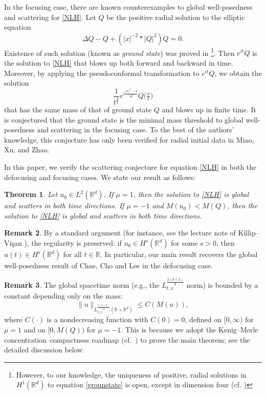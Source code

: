 \documentclass[reqno,11pt]{amsart}
\theoremstyle{plain}
\newtheorem{theorem}{Theorem}
\theoremstyle{definition}
\newtheorem{remark}[theorem]{Remark}
\numberwithin{equation}{section}
\numberwithin{theorem}{section}
\def\leq{\leqslant}
\def\R{\mathbb{R}}
\begin{document}
In the focusing case, there are known counterexamples to global well-posedness and scattering for \eqref{NLH}. Let $Q$ be the positive radial solution to the elliptic equation
\begin{equation}\label{grounstate}
    \Delta Q - Q + \left(|x|^{-2}*|Q|^2\right)Q = 0. 
\end{equation}
Existence of such solution (known as \emph{ground state}) was proved in \cite{MiaoXuZhaoblowup,Moroz}\footnote{However, to our knowledge, the uniqueness of positive, radial solutions in $H^1(\mathbb{R}^d)$ to equation \eqref{grounstate} is open, except in dimension four (cf. \cite{Krieger})}. Then $e^{it}Q$ is the solution to \eqref{NLH} that blows up both forward and backward in time. Moreover, by applying the pseudoconformal transformation to $e^{it}Q$, we obtain the solution
\[
\frac{1}{t^{\frac{d}{2}}}e^{i\frac{|x|^2-4}{4t}}Q\big(\tfrac{x}{t}\big)
\]
that has the same mass of that of ground state $Q$ and blows up in finite time. It is conjectured that the ground state is the minimal mass threshold to global well-posedness and scattering in the focusing case. To the best of the authors' knowledge, this conjecture has only been verified for radial initial data in Miao, Xu, and Zhao\cite{MXZ-JMPA}.

In this paper, we verify the scattering conjecture for equation \eqref{NLH} in both the defocusing and focusing cases. We state our result as follows:
\begin{theorem}\label{main}
Let $u_0\in L^2(\R^d)$. If $\mu=1$, then the solution to \eqref{NLH} is global and scatters in both time directions. If $\mu=-1$ and $M(u_0)<M(Q)$, then the solution to \eqref{NLH}  is global and scatters in both time directions.
\end{theorem}

\begin{remark}
    By a standard argument (for instance, see the lecture note of Killip--Vi\c{s}an \cite{KV}), the regularity is preserved: if $u_0\in H^s(\mathbb{R}^d)$ for some $s>0$, then $u(t)\in H^s(\mathbb{R}^d)$ for all $t\in\R$. In particular, our main result recovers the global well-posedness result of Chae, Cho and Lee \cite{CCS} in the defocusing case.
\end{remark}
\begin{remark}
    The global spacetime norm (e.g., the $L_{t,x}^{\frac{2(d+2)}{d}}$ norm) is bounded by a constant depending only on the mass: 
    \[
    \|u\|_{L_{t,x}^{\frac{2(d+2)}{d}}(\R\times\R^d)}\leq C(M(u)),
    \]
where $C(\cdot)$ is a nondecreasing function with $C(0)=0$, defined on $[0,\infty)$ for $\mu=1$ and on $[0,M(Q))$ for $\mu=-1$. This is because we adopt the Kenig--Merle concentration--compactness roadmap (cf.~\cite{KM-Invent}) to prove the main theorem; see the detailed discussion below.
\end{remark}
\end{document}
